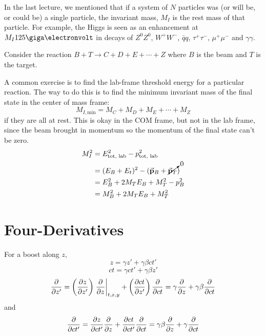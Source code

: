 \documentclass[a4paper,twoside,master.tex]{subfiles}
\begin{document}

In the last lecture, we mentioned that if a system of $ N $ particles was (or will be, or could be) a single particle, the invariant mass, $ M_I $ is the rest mass of that particle. For example, the Higgs is seen as an enhancement at $ M_I 125\giga\electronvolt $ in decays of $ Z^0 Z^0 $, $ W^+ W^- $, $ \bar{q} q $, $ \tau^+ \tau^- $, $ \mu^+ \mu^- $ and $ \gamma \gamma $.

Consider the reaction $ B + T \to C + D + E + \cdots + Z $ where $ B $ is the beam and $ T $ is the target.

A common exercise is to find the lab-frame threshold energy for a particular reaction. The way to do this is to find the minimum invariant mass of the final state in the center of mass frame:
\begin{equation}
    M_{I,\text{min}} = M_{C} + M_{D} + M_{E} + \cdots + M_{Z}
\end{equation}
if they are all at rest. This is okay in the COM frame, but not in the lab frame, since the beam brought in momentum so the momentum of the final state can't be zero.
\begin{align}
    M_I^2 &= E^2_{\text{tot, lab}} - p^2_{\text{tot, lab}}\\
    &= (E_B + E_t)^2 - (\va{p}_{B} + \cancelto{0}{\va{p}_T})\\
    &= E_B^2 + 2 M_T E_B + M_T^2 - p_B^2\\
    &= M_B^2 + 2 M_T E_B + M_T^2
\end{align}

\section{Four-Derivatives}
\label{sec:four-derivatives}

For a boost along $ z $,
\begin{equation}
    z = \gamma z' + \gamma \beta c t'
\end{equation}
\begin{equation}
    c t = \gamma c t' + \gamma \beta z'
\end{equation}
\begin{equation}
    \pdv{z'} = \left( \pdv{z}{z'} \right) \eval{\pdv{z}}_{t,x,y} + \left( \pdv{ct}{z'} \right) \pdv{ct} = \gamma \pdv{z}+ \gamma \beta \pdv{ct}
\end{equation}
and
\begin{equation}
    \pdv{ct'} = \pdv{z}{ct'} \pdv{z}+ \pdv{ct}{ct'} \pdv{ct} = \gamma \beta \pdv{z}+ \gamma \pdv{ct}
\end{equation}
\end{document}
